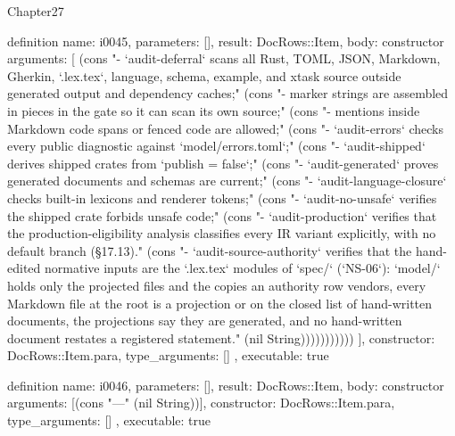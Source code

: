 \begin{lexlean}{Chapter27}
\begin{semanticmodule}
definition{
  name: i0045,
  parameters: [],
  result: DocRows::Item,
  body: constructor{
    arguments: [
      (cons "- `audit-deferral` scans all Rust, TOML, JSON, Markdown, Gherkin, `.lex.tex`, language, schema, example, and xtask source outside generated output and dependency caches;" (cons "- marker strings are assembled in pieces in the gate so it can scan its own source;" (cons "- mentions inside Markdown code spans or fenced code are allowed;" (cons "- `audit-errors` checks every public diagnostic against `model/errors.toml`;" (cons "- `audit-shipped` derives shipped crates from `publish = false`;" (cons "- `audit-generated` proves generated documents and schemas are current;" (cons "- `audit-language-closure` checks built-in lexicons and renderer tokens;" (cons "- `audit-no-unsafe` verifies the shipped crate forbids unsafe code;" (cons "- `audit-production` verifies that the production-eligibility analysis classifies every IR variant explicitly, with no default branch (§17.13)." (cons "- `audit-source-authority` verifies that the hand-edited normative inputs are the `.lex.tex` modules of `spec/` (`NS-06`): `model/` holds only the projected files and the copies an authority row vendors, every Markdown file at the root is a projection or on the closed list of hand-written documents, the projections say they are generated, and no hand-written document restates a registered statement." (nil String)))))))))))
    ],
    constructor: DocRows::Item.para,
    type_arguments: []
  },
  executable: true
}

definition{
  name: i0046,
  parameters: [],
  result: DocRows::Item,
  body: constructor{
    arguments: [(cons "---" (nil String))],
    constructor: DocRows::Item.para,
    type_arguments: []
  },
  executable: true
}
\end{semanticmodule}
\end{lexlean}

